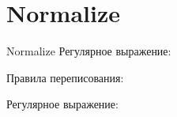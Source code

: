 \section{Normalize}
\begin{frame}{Normalize}
	Регулярное выражение:

	Правила переписования:


	Регулярное выражение:

\end{frame}
